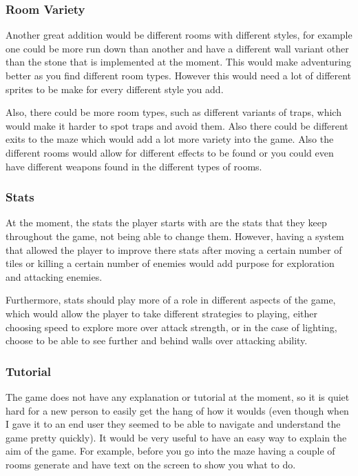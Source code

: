 \documentclass[../Main.tex]{subfiles}
\begin{document}
        \subsubsection{Room Variety}
            Another great addition would be different rooms with different styles, for example one could be more run down than another and have a different wall variant other than the stone that is implemented at the moment. This would make adventuring better as you find different room types. However this would need a lot of different sprites to be make for every different style you add.

            Also, there could be more room types, such as different variants of traps, which would make it harder to spot traps and avoid them. Also there could be different exits to the maze which would add a lot more variety into the game. Also the different rooms would allow for different effects to be found or you could even have different weapons found in the different types of rooms.

        \subsubsection{Stats}
            At the moment, the stats the player starts with are the stats that they keep throughout the game, not being able to change them. However, having a system that allowed the player to improve there stats after moving a certain number of tiles or killing a certain number of enemies would add purpose for exploration and attacking enemies.

            Furthermore, stats should play more of a role in different aspects of the game, which would allow the player to take different strategies to playing, either choosing speed to explore more over attack strength, or in the case of lighting, choose to be able to see further and behind walls over attacking ability.

        \subsubsection{Tutorial}
            The game does not have any explanation or tutorial at the moment, so it is quiet hard for a new person to easily get the hang of how it woulds (even though when I gave it to an end user they seemed to be able to navigate and understand the game pretty quickly). It would be very useful to have an easy way to explain the aim of the game. For example, before you go into the maze having a couple of rooms generate and have text on the screen to show you what to do.
\end{document}
